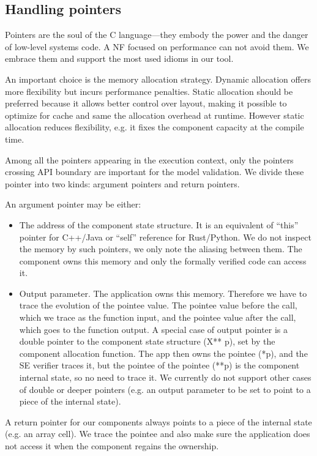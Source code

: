 \documentclass[letterpaper,twocolumn,10pt]{article}
\begin{document}
\subsection{Handling pointers}
\label{sec:handling-pointers}

Pointers are the soul of the C language---they embody the power and the danger of low-level systems code. A NF focused on performance can not avoid them. We embrace them and support the most used idioms in our tool.

An important choice is the memory allocation strategy. Dynamic allocation offers more flexibility but incurs performance penalties. Static allocation should be preferred because it allows better control over layout, making it possible to optimize for cache and same the allocation overhead at runtime. However static allocation reduces flexibility, e.g. it fixes the component capacity at the compile time.

Among all the pointers appearing in the execution context, only the pointers crossing API boundary are important for the model validation. We divide these pointer into two kinds: argument pointers and return pointers.

An argument pointer may be either:
\begin{itemize}
    \item The address of the component state structure. It is an equivalent of ``this'' pointer for C++/Java or ``self'' reference for Rust/Python. We do not inspect the memory by such pointers, we only note the aliasing between them. The component owns this memory and only the formally verified code can access it.
    \item Output parameter. The application owns this memory. Therefore we have to trace the evolution of the pointee value. The pointee value before the call, which we trace as the function input, and the pointee value after the call, which goes to the function output. A special case of output pointer is a double pointer to the component state structure (X** p), set by the component allocation function. The app then owns the pointee (*p), and the SE verifier traces it, but the pointee of the pointee (**p) is the component internal state, so no need to trace it. We currently do not support other cases of double or deeper pointers (e.g. an output parameter to be set to point to a piece of the internal state).
\end{itemize}

A return pointer for our components always points to a piece of the internal state (e.g. an array cell). We trace the pointee and also make sure the application does not access it when the component regains the ownership.
\end{document}
